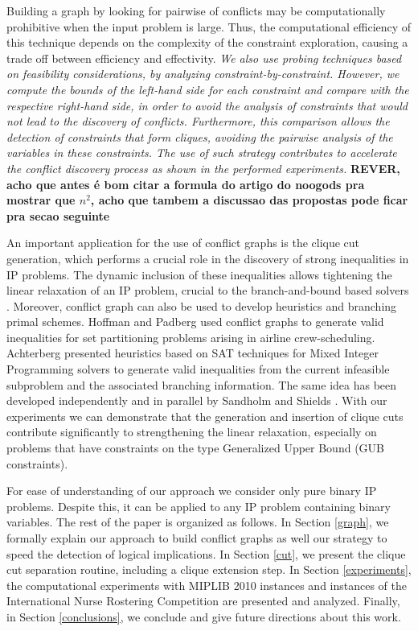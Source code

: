 \documentclass{endm}
\begin{document}
Building a graph by looking for pairwise of conflicts may be computationally prohibitive when the input problem is large. Thus, the computational efficiency of this technique depends on the complexity of the constraint exploration, causing a trade off between efficiency and effectivity.  \textit{We also use probing techniques based on feasibility considerations, by analyzing constraint-by-constraint. However, we compute the bounds of the left-hand side for each constraint and compare with the respective right-hand side, in order to avoid the analysis of constraints that would not lead to the discovery of conflicts. Furthermore, this comparison allows the detection of constraints that form cliques, avoiding the pairwise analysis of the variables in these constraints. The use of such strategy contributes to accelerate the conflict discovery process as shown in the performed experiments.}   \textbf{REVER, acho que antes é bom citar a formula do artigo do noogods pra mostrar que $n^{2}$, acho que tambem a discussao das propostas pode ficar pra secao seguinte }

An important application for the use of conflict graphs is the clique cut generation, which performs a crucial role in the discovery of strong inequalities \cite{chvatal} in IP problems. The dynamic inclusion of these inequalities allows tightening the linear relaxation of an IP problem, crucial to the branch-and-bound based solvers \cite{atamturk}. Moreover, conflict graph can also be used to develop heuristics and branching primal schemes. Hoffman and Padberg \cite{hoffman} used conflict graphs to generate valid inequalities for set partitioning problems arising in airline crew-scheduling. Achterberg \cite{achterberg} presented heuristics based on SAT techniques for Mixed Integer Programming solvers to generate valid inequalities from the current infeasible subproblem and the associated branching information. The same idea has been developed independently and in parallel by Sandholm and Shields \cite{sandholm}. With our experiments we can demonstrate that the generation and insertion of clique cuts contribute significantly to strengthening the linear relaxation, especially on problems that have constraints on the type Generalized Upper Bound (GUB constraints).

For ease of understanding of our approach we consider only pure binary IP problems. Despite this, it can be applied to any IP problem containing binary variables. The rest of the paper is organized as follows. In Section \ref{graph}, we formally explain our approach to build conflict graphs as well our strategy to speed the detection of logical implications. In Section \ref{cut}, we present the clique cut separation routine, including a clique extension step. In Section \ref{experiments}, the computational experiments with MIPLIB 2010 instances \cite{miplib} and instances of the International Nurse Rostering Competition \cite{haspeslagh} are presented and analyzed. Finally, in Section \ref{conclusions}, we conclude and give future directions about this work.
\end{document}
